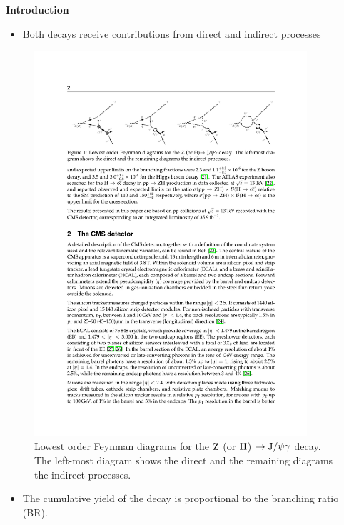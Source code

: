 \documentclass[aspectratio = 1610, xcolor = dvipsnames]{beamer}
\renewcommand{\H}{{\rm H}}
\newcommand{\Z}{{\rm Z}}
\newcommand{\JPsi}{{\rm J}/\psi}
\begin{document}
	
	\begin{frame}[t]{\bf Introduction}
		\begin{itemize}
			\item Both decays receive contributions from \textcolor{unipd}{direct} and \textcolor{unipd}{indirect} processes
		\end{itemize}

		\begin{figure}[c]
			\centering
			\includegraphics[width=0.9\textwidth]{images/direct_and_indirect_processes.pdf}
			\caption{Lowest order Feynman diagrams for the $\Z$ (or $\H$) $\rightarrow \JPsi\gamma$ decay. The left-most diagram shows the direct and the remaining diagrams the indirect processes\footnotemark.
			\label{im:direct_and_indirect_processes}}
	    \end{figure}
	    
	    \begin{itemize}
			\item The cumulative yield of the decay is \textcolor{unipd}{proportional to the branching ratio (BR)}.
		\end{itemize}
	\end{frame}
	
\end{document}

